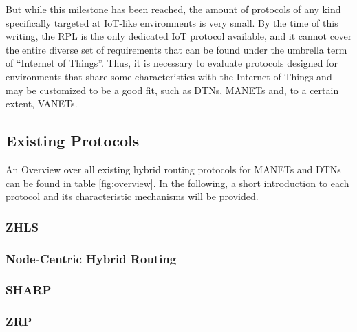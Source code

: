 \documentclass[a4paper,10pt]{scrartcl}
\begin{document}
But while this milestone has been reached, the amount of protocols of any kind specifically targeted at IoT-like environments is very small. By the time of this writing, the \gls{RPL} is the only dedicated IoT protocol available, and it cannot cover the entire diverse set of requirements that can be found under the umbrella term of ``Internet of Things''. Thus, it is necessary to evaluate protocols designed for environments that share some characteristics with the Internet of Things and may be customized to be a good fit, such as \glspl{DTN}, \glspl{MANET} and, to a certain extent, \glspl{VANET}.\\

\subsection{Existing Protocols}
\label{subsec:existing_protocols}
An Overview over all existing hybrid routing protocols for \glspl{MANET} and \glspl{DTN} %
can be found in table \ref{fig:overview}. In the following, a short introduction to each protocol and its characteristic mechanisms will be provided.

\subsubsection{\gls{ZHLS}}
\label{subsec:sharp}

\subsubsection{Node-Centric Hybrid Routing}
\label{subsec:existing_protocols}

\subsubsection{\gls{SHARP}}
\label{subsec:sharp}

\subsubsection{\gls{ZRP}}
\label{subsec:sharp}
\end{document}

